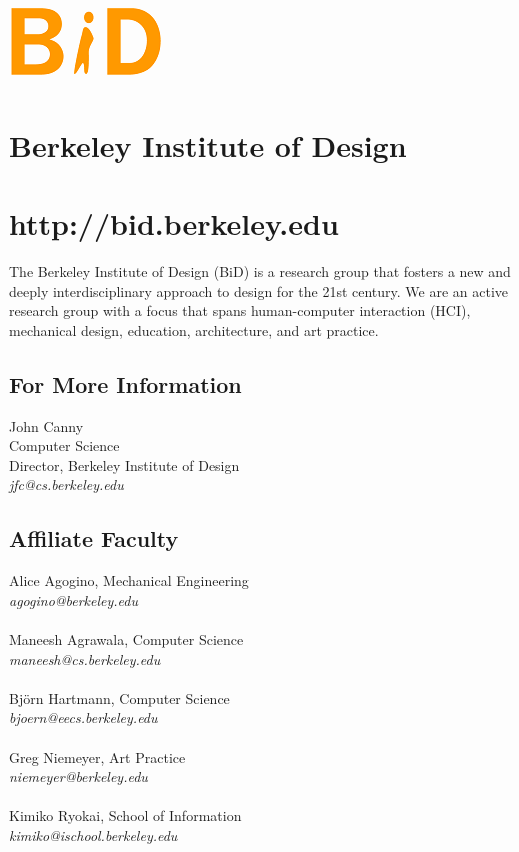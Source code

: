 \documentclass[foldmark,10pt,a4paper,notumble]{leaflet}
\begin{document}
\begin{center}
\includegraphics{bid.png}
\section{Berkeley Institute of Design}
\section{http://bid.berkeley.edu}
\end{center}
The Berkeley Institute of Design (BiD) is a research group that fosters a new and deeply interdisciplinary approach to design for the 21st century.  We are an active research group with a focus that spans human-computer interaction (HCI), mechanical design, education, architecture, and art practice.\\

\subsection{For More Information}
John Canny\\
Computer Science\\
Director, Berkeley Institute of Design\\
\emph{jfc@cs.berkeley.edu}

\subsection{Affiliate Faculty}
Alice Agogino, Mechanical Engineering\\
\emph{agogino@berkeley.edu}\\
\\
Maneesh Agrawala, Computer Science\\
\emph{maneesh@cs.berkeley.edu}\\
\\
Bj\"orn Hartmann, Computer Science\\
\emph{bjoern@eecs.berkeley.edu}\\
\\
Greg Niemeyer, Art Practice\\
\emph{niemeyer@berkeley.edu}\\
\\
Kimiko Ryokai, School of Information\\
\emph{kimiko@ischool.berkeley.edu}\\
\newpage
\fontsize{3mm}{3.5mm}\selectfont
\end{document}
